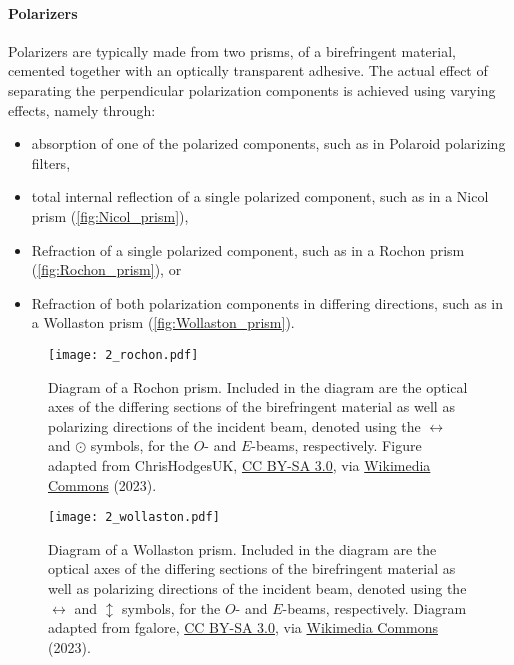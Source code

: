 \paragraph{Polarizers} \label{par:polarizer}
Polarizers are typically made from two prisms, of a birefringent material, cemented together with an optically transparent adhesive. The actual effect of separating the perpendicular polarization components is achieved using varying effects, namely through:
\begin{itemize}
    \item absorption of one of the polarized components, such as in Polaroid polarizing filters,
    \item total internal reflection of a single polarized component, such as in a Nicol prism (\autoref{fig:Nicol_prism}),
    \item Refraction of a single polarized component, such as in a Rochon prism (\autoref{fig:Rochon_prism}), or
    \item Refraction of both polarization components in differing directions, such as in a Wollaston prism (\autoref{fig:Wollaston_prism}).
\end{itemize}

\begin{figure}[t]
    \centering
    \texttt{[image: 2\_rochon.pdf]}
    \caption{Diagram of a Rochon prism. Included in the diagram are the optical axes of the differing sections of the birefringent material as well as polarizing directions of the incident beam, denoted using the $\leftrightarrow$ and $\odot$ symbols, for the $O$- and $E$-beams, respectively. Figure adapted from ChrisHodgesUK, \protect\href{https://creativecommons.org/licenses/by-sa/3.0/}{CC BY-SA 3.0}, via \protect\href{https://commons.wikimedia.org/wiki/File:Rochon_Prism.svg}{Wikimedia Commons} (2023).}
    \label{fig:Rochon_prism}
\end{figure}

\begin{figure}[t]
    \centering
    \texttt{[image: 2\_wollaston.pdf]}
    \caption{Diagram of a Wollaston prism. Included in the diagram are the optical axes of the differing sections of the birefringent material as well as polarizing directions of the incident beam, denoted using the $\leftrightarrow$ and $\updownarrow$ symbols, for the $O$- and $E$-beams, respectively. Diagram adapted from fgalore, \protect\href{https://creativecommons.org/licenses/by-sa/3.0/}{CC BY-SA 3.0}, via \protect\href{https://commons.wikimedia.org/wiki/File:Wollaston-prism.svg}{Wikimedia Commons} (2023).}
    \label{fig:Wollaston_prism}
\end{figure}

